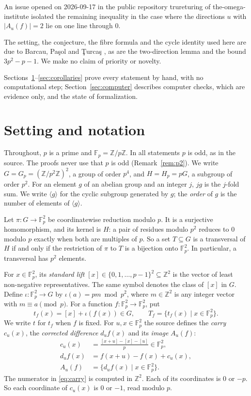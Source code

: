 \documentclass[11pt]{amsart}
\theoremstyle{definition}\newtheorem{definition}[theorem]{Definition}
\theoremstyle{remark}\newtheorem{remark}[theorem]{Remark}
\newcommand{\F}{\mathbb{F}}
\newcommand{\Z}{\mathbb{Z}}
\newcommand{\abs}[1]{\lvert #1\rvert}
\newcommand{\gen}[1]{\langle #1\rangle}
\begin{document}
An issue opened on 2026-09-17 in the public repository trureturing of the-omega-institute \cite{trureturing} isolated the remaining inequality in the case where the directions \(u\) with \(\abs{A_u(f)}=2\) lie on one line through \(0\).

The setting, the conjecture, the fibre formula and the cycle identity used here are due to Barcau, Pa\c{s}ol and \c{T}urca\c{s} \cite{BPT}, as are the two-direction lemma and the bound \(3p^2-p-1\).
We make no claim of priority or novelty.

Sections~\ref{sec:setting}--\ref{sec:corollaries} prove every statement by hand, with no computational step; Section~\ref{sec:computer} describes computer checks, which are evidence only, and the state of formalization.

\section{Setting and notation}\label{sec:setting}

Throughout, \(p\) is a prime and \(\F_p=\Z/p\Z\).
In all statements \(p\) is odd, as in the source.
The proofs never use that \(p\) is odd (Remark~\ref{rem:p2}).
We write \(G=G_p=(\Z/p^2\Z)^2\), a group of order \(p^4\), and \(H=H_p=pG\), a subgroup of order \(p^2\).
For an element \(g\) of an abelian group and an integer \(j\), \(jg\) is the \(j\)-fold sum.
We write \(\gen{g}\) for the cyclic subgroup generated by \(g\); the \emph{order} of \(g\) is the number of elements of \(\gen{g}\).

Let \(\pi\colon G\to\F_p^2\) be coordinatewise reduction modulo \(p\).
It is a surjective homomorphism, and its kernel is \(H\): a pair of residues modulo \(p^2\) reduces to \(0\) modulo \(p\) exactly when both are multiples of \(p\).
So a set \(T\subseteq G\) is a transversal of \(H\) if and only if the restriction of \(\pi\) to \(T\) is a bijection onto \(\F_p^2\).
In particular, a transversal has \(p^2\) elements.

For \(x\in\F_p^2\), its \emph{standard lift} \([x]\in\{0,1,\dots,p-1\}^2\subseteq\Z^2\) is the vector of least non-negative representatives.
The same symbol denotes the class of \([x]\) in \(G\).
Define \(\iota\colon\F_p^2\to G\) by \(\iota(a)=pm\bmod p^2\), where \(m\in\Z^2\) is any integer vector with \(m\equiv a\pmod p\).
For a function \(f\colon\F_p^2\to\F_p^2\), put
\[
t_f(x)=[x]+\iota(f(x))\in G,\qquad T_f=\{t_f(x)\mid x\in\F_p^2\}.
\]
We write \(t\) for \(t_f\) when \(f\) is fixed.
For \(u,x\in\F_p^2\) the source defines the \emph{carry} \(c_u(x)\), the \emph{corrected difference} \(d_uf(x)\) and its \emph{image} \(A_u(f)\):
\begin{align}
c_u(x)&=\frac{[x+u]-[x]-[u]}{p}\in\F_p^2,\label{eq:carry}\\
d_uf(x)&=f(x+u)-f(x)+c_u(x),\label{eq:du}\\
A_u(f)&=\{d_uf(x)\mid x\in\F_p^2\}.\label{eq:Au}
\end{align}
The numerator in \eqref{eq:carry} is computed in \(\Z^2\).
Each of its coordinates is \(0\) or \(-p\).
So each coordinate of \(c_u(x)\) is \(0\) or \(-1\), read modulo \(p\).
\end{document}
